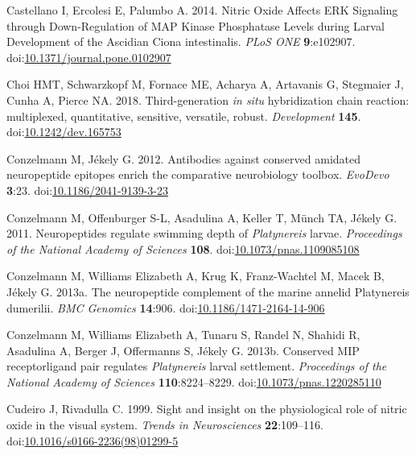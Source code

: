 \documentclass[
  10pt,
  onecolumn]{article}
\newlength{\cslhangindent}
\newlength{\cslentryspacingunit} %
\newenvironment{CSLReferences}[2] %
 {%
  \setlength{\parindent}{0pt}
  \ifodd #1
  \let\oldpar\par
  \def\par{\hangindent=\cslhangindent\oldpar}
  \fi
  \setlength{\parskip}{#2\cslentryspacingunit}
 }%
 {}
\begin{document}
\begin{CSLReferences}{1}{0}
\leavevmode{}%
Castellano I, Ercolesi E, Palumbo A. 2014. Nitric Oxide Affects ERK
Signaling through Down-Regulation of MAP Kinase Phosphatase Levels
during Larval Development of the Ascidian Ciona intestinalis. \emph{PLoS
ONE} \textbf{9}:e102907.
doi:\href{https://doi.org/10.1371/journal.pone.0102907}{10.1371/journal.pone.0102907}

\leavevmode{}%
Choi HMT, Schwarzkopf M, Fornace ME, Acharya A, Artavanis G, Stegmaier
J, Cunha A, Pierce NA. 2018. Third-generation {\emph{in situ}}
hybridization chain reaction: multiplexed, quantitative, sensitive,
versatile, robust. \emph{Development} \textbf{145}.
doi:\href{https://doi.org/10.1242/dev.165753}{10.1242/dev.165753}

\leavevmode{}%
Conzelmann M, Jékely G. 2012. Antibodies against conserved amidated
neuropeptide epitopes enrich the comparative neurobiology toolbox.
\emph{EvoDevo} \textbf{3}:23.
doi:\href{https://doi.org/10.1186/2041-9139-3-23}{10.1186/2041-9139-3-23}

\leavevmode{}%
Conzelmann M, Offenburger S-L, Asadulina A, Keller T, Münch TA, Jékely
G. 2011. Neuropeptides regulate swimming depth of {\emph{Platynereis}}
larvae. \emph{Proceedings of the National Academy of Sciences}
\textbf{108}.
doi:\href{https://doi.org/10.1073/pnas.1109085108}{10.1073/pnas.1109085108}

\leavevmode{}%
Conzelmann M, Williams Elizabeth A, Krug K, Franz-Wachtel M, Macek B,
Jékely G. 2013a. The neuropeptide complement of the marine annelid
Platynereis dumerilii. \emph{BMC Genomics} \textbf{14}:906.
doi:\href{https://doi.org/10.1186/1471-2164-14-906}{10.1186/1471-2164-14-906}

\leavevmode{}%
Conzelmann M, Williams Elizabeth A, Tunaru S, Randel N, Shahidi R,
Asadulina A, Berger J, Offermanns S, Jékely G. 2013b. Conserved MIP
receptor{\textendash}ligand pair regulates {\emph{Platynereis}} larval
settlement. \emph{Proceedings of the National Academy of Sciences}
\textbf{110}:8224--8229.
doi:\href{https://doi.org/10.1073/pnas.1220285110}{10.1073/pnas.1220285110}

\leavevmode{}%
Cudeiro J, Rivadulla C. 1999. Sight and insight {\textendash} on the
physiological role of nitric oxide in the visual system. \emph{Trends in
Neurosciences} \textbf{22}:109--116.
doi:\href{https://doi.org/10.1016/s0166-2236(98)01299-5}{10.1016/s0166-2236(98)01299-5}


\end{CSLReferences}
\end{document}
